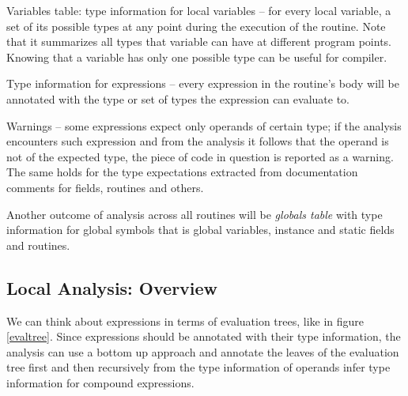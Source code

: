         \begin{description*}
            \item[Variables table: type information for local variables] -- 
            for every local variable, a set of its possible types at any 
            point during the execution of the routine. Note that it summarizes 
            all types that variable can have at different program points. 
            Knowing that a variable has only one possible type can be useful 
            for compiler.
            
            \item[Type information for expressions] -- every expression in the 
            routine's body will be annotated with the type or set of types 
            the expression can evaluate to.
            
            \item[Warnings] -- some expressions expect only operands of 
            certain type; if the analysis encounters such expression 
            and from the analysis it follows that the operand is not of the 
            expected type, the piece of code in question is reported as a warning.
            The same holds for the type expectations extracted from 
            documentation comments for fields, routines and others.
            
        \end{description*}
        
        Another outcome of analysis across all routines will be \emph{globals table} 
        with type information for global symbols that is global variables, 
        instance and static fields and routines.
        
        \subsection{Local Analysis: Overview}
        
        We can think about expressions in terms of 
        evaluation trees, like in figure \ref{evaltree}. 
        Since expressions should be annotated with their 
        type information, the analysis can use a bottom 
        up approach and annotate the leaves of the 
        evaluation tree first and then recursively from 
        the type information of operands infer type 
        information for compound expressions.
        

